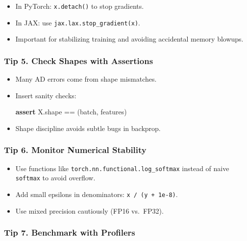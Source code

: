 \documentclass[
  letterpaper,
  DIV=11,
  numbers=noendperiod]{scrreprt}
\newenvironment{Shaded}{\begin{snugshade}}{\end{snugshade}}
\newcommand{\ControlFlowTok}[1]{\textcolor[rgb]{0.00,0.23,0.31}{\textbf{#1}}}
\newcommand{\NormalTok}[1]{\textcolor[rgb]{0.00,0.23,0.31}{#1}}
\newcommand{\OperatorTok}[1]{\textcolor[rgb]{0.37,0.37,0.37}{#1}}
\providecommand{\tightlist}{%
  \setlength{\itemsep}{0pt}\setlength{\parskip}{0pt}}
\begin{document}
\begin{itemize}
\tightlist
\item
  In PyTorch: \texttt{x.detach()} to stop gradients.
\item
  In JAX: use \texttt{jax.lax.stop\_gradient(x)}.
\item
  Important for stabilizing training and avoiding accidental memory
  blowups.
\end{itemize}

\subsubsection{Tip 5. Check Shapes with
Assertions}\label{tip-5.-check-shapes-with-assertions}

\begin{itemize}
\item
  Many AD errors come from shape mismatches.
\item
  Insert sanity checks:

\begin{Shaded}
\begin{Highlighting}[]
\ControlFlowTok{assert}\NormalTok{ X.shape }\OperatorTok{==}\NormalTok{ (batch, features)}
\end{Highlighting}
\end{Shaded}
\item
  Shape discipline avoids subtle bugs in backprop.
\end{itemize}

\subsubsection{Tip 6. Monitor Numerical
Stability}\label{tip-6.-monitor-numerical-stability}

\begin{itemize}
\tightlist
\item
  Use functions like \texttt{torch.nn.functional.log\_softmax} instead
  of naive \texttt{softmax} to avoid overflow.
\item
  Add small epsilons in denominators: \texttt{x\ /\ (y\ +\ 1e-8)}.
\item
  Use mixed precision cautiously (FP16 vs.~FP32).
\end{itemize}

\subsubsection{Tip 7. Benchmark with
Profilers}\label{tip-7.-benchmark-with-profilers}
\end{document}
